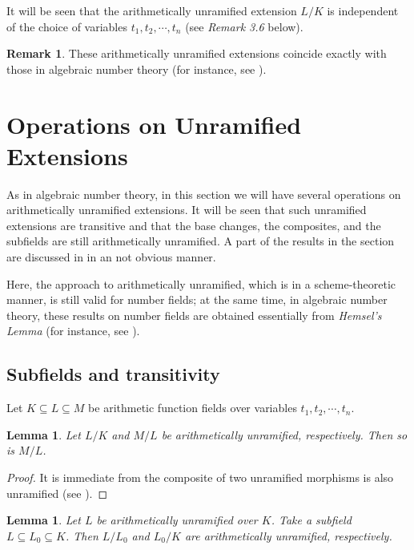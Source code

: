 \documentclass{amsart}
\newtheorem{lemma}[theorem]{Lemma}
\theoremstyle{definition}
\newtheorem{remark}[theorem]{Remark}
\numberwithin{equation}{section}
\begin{document}
It will be seen that the arithmetically unramified extension $L/K$ is
independent of the choice of variables $t_{1},t_{2},\cdots, t_{n}$ (see
\emph{Remark 3.6} below).

\begin{remark}
These arithmetically unramified extensions coincide exactly with those in
algebraic number theory (for instance, see \cite{mln,neu}).
\end{remark}

\section{Operations on Unramified Extensions}

As in algebraic number theory, in this section we will have several operations on arithmetically unramified
extensions. It will be seen that such unramified extensions are transitive and that
the base changes, the composites, and the subfields are still
arithmetically unramified. A part of the results in the section are discussed in \cite{an4} in an
not obvious manner.

Here, the approach to arithmetically unramified, which is in a scheme-theoretic manner, is still valid for number fields;
at the same time, in algebraic number theory, these results on number fields are obtained essentially from \emph{Hemsel's Lemma} (for instance, see \cite{neu}).



\subsection{Subfields and transitivity}

Let $K\subseteq L\subseteq M$ be arithmetic function fields over variables $t_{1},t_{2},\cdots, t_{n}$.

\begin{lemma}
Let $L/K$ and $M/L$ be arithmetically unramified, respectively. Then so is $M/L$.
\end{lemma}

\begin{proof}
It is immediate from the composite of two unramified morphisms is also
unramified (see \cite{sga1,mln}).
\end{proof}

\begin{lemma}
Let $L$ be arithmetically unramified over $K$. Take a subfield $L\subseteq
L_{0}\subseteq K$. Then $L/L_{0}$ and $L_{0}/K$ are arithmetically
unramified, respectively.
\end{lemma}
\end{document}
